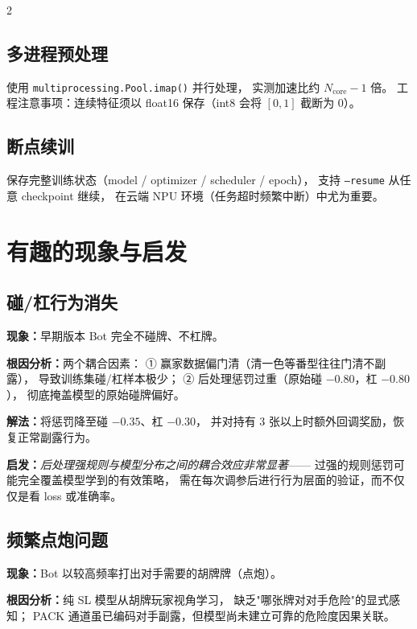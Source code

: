 \documentclass{article}
\begin{document}
\begin{multicols}{2}
\subsection{多进程预处理}

使用 \texttt{multiprocessing.Pool.imap()} 并行处理，
实测加速比约 $N_{\text{core}}-1$ 倍。
工程注意事项：连续特征须以 float16 保存（int8 会将 $[0,1]$ 截断为 0）。

\subsection{断点续训}

保存完整训练状态（model / optimizer / scheduler / epoch），
支持 \texttt{--resume} 从任意 checkpoint 继续，
在云端 NPU 环境（任务超时频繁中断）中尤为重要。

\section{有趣的现象与启发}
\label{sec:phenomenon}

\subsection{碰/杠行为消失}

\textbf{现象：}早期版本 Bot 完全不碰牌、不杠牌。

\textbf{根因分析：}两个耦合因素：
① 赢家数据偏门清（清一色等番型往往门清不副露），
   导致训练集碰/杠样本极少；
② 后处理惩罚过重（原始碰 $-0.80$，杠 $-0.80$），
   彻底掩盖模型的原始碰牌偏好。

\textbf{解法：}将惩罚降至碰 $-0.35$、杠 $-0.30$，
并对持有 3 张以上时额外回调奖励，恢复正常副露行为。

\textbf{启发：}\textit{后处理强规则与模型分布之间的耦合效应非常显著}——
过强的规则惩罚可能完全覆盖模型学到的有效策略，
需在每次调参后进行行为层面的验证，而不仅仅是看 loss 或准确率。

\subsection{频繁点炮问题}

\textbf{现象：}Bot 以较高频率打出对手需要的胡牌牌（点炮）。

\textbf{根因分析：}纯 SL 模型从胡牌玩家视角学习，
缺乏"哪张牌对对手危险"的显式感知；
PACK 通道虽已编码对手副露，但模型尚未建立可靠的危险度因果关联。


\end{multicols}
\end{document}
